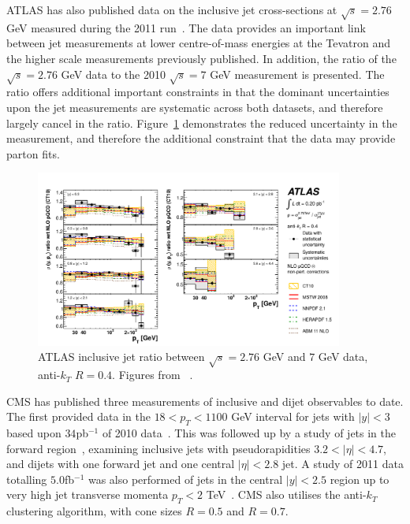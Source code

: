 ATLAS has also published data on the inclusive jet cross-sections at $\sqrt{s} = 2.76$ GeV measured during the 2011 run~\cite{Aad:2013lpa}. The data provides an important link between jet measurements at lower centre-of-mass energies at the Tevatron and the higher scale measurements previously published. In addition, the ratio of the $\sqrt{s} = 2.76$ GeV data to the 2010 $\sqrt{s}=7$ GeV measurement is presented. The ratio offers additional important constraints in that the dominant uncertainties upon the jet measurements are systematic across both datasets, and therefore largely cancel in the ratio. Figure~\ref{fig:ATLASJETSRAT} demonstrates the reduced uncertainty in the measurement, and therefore the additional constraint that the data may provide parton fits.

\begin{figure}[ht]
\centering
\includegraphics[width=0.90\textwidth]{5-LHCdata/figs/FinalRatioBandPTR04.pdf}
\caption[ATLAS inclusive jet ratio between $\sqrt{s} = 2.76$ GeV and $7$ GeV data] {ATLAS inclusive jet ratio between $\sqrt{s} = 2.76$ GeV and $7$ GeV data, anti-$k_T$ $R=0.4$. Figures from ~\cite{Aad:2013lpa}.}
\label{fig:ATLASJETSRAT}
\end{figure}


CMS has published three measurements of inclusive and dijet observables to date. The first provided data in the $18 < p_T < 1100$ GeV interval for jets with $|y|<3$ based upon $34$pb$^{-1}$ of 2010 data~\cite{CMS:2011ab}. This was followed up
by a study of jets in the forward region~\cite{Chatrchyan:2012gwa}, examining inclusive jets with pseudorapidities $3.2<|\eta|<4.7$, and dijets with one forward jet and one central $|\eta|<2.8$ jet. A study of 2011 data totalling $5.0$fb$^{-1}$ was also
performed of jets in the central $|y|<2.5$ region up to very high jet transverse momenta $p_T < 2$ TeV~\cite{Chatrchyan:2012bja}. CMS also utilises the anti-$k_T$ clustering algorithm, with cone sizes $R=0.5$ and $R=0.7$.


